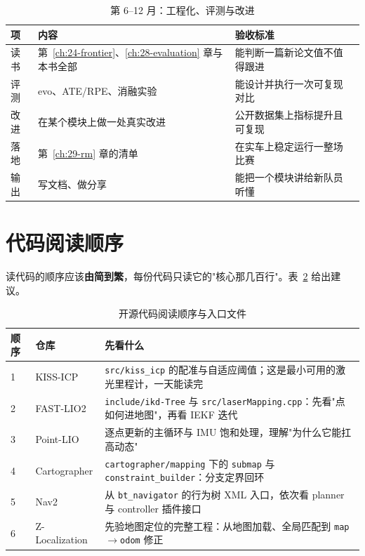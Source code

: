 \begin{table}[htbp]
  \centering
  \caption{第 6--12 月：工程化、评测与改进}\label{tab:30-s4}
  \small
  \begin{tabular}{lp{3.4cm}p{3.6cm}p{3.6cm}}
    \toprule
    项 & 内容 & 验收标准 \\
    \midrule
    读书 & 第~\ref{ch:24-frontier}、\ref{ch:28-evaluation} 章与本书全部 & 能判断一篇新论文值不值得跟进 \\
    评测 & evo、ATE/RPE、消融实验 & 能设计并执行一次可复现对比 \\
    改进 & 在某个模块上做一处真实改进 & 公开数据集上指标提升且可复现 \\
    落地 & 第~\ref{ch:29-rm} 章的清单 & 在实车上稳定运行一整场比赛 \\
    输出 & 写文档、做分享 & 能把一个模块讲给新队员听懂 \\
    \bottomrule
  \end{tabular}
\end{table}

\section{代码阅读顺序}\label{sec:30-code}

读代码的顺序应该\textbf{由简到繁}，每份代码只读它的"核心那几百行"。表~\ref{tab:30-code} 给出建议。

\begin{table}[htbp]
  \centering
  \caption{开源代码阅读顺序与入口文件}\label{tab:30-code}
  \footnotesize
  \begin{tabular}{p{2.5cm}p{4.4cm}p{6.6cm}}
    \toprule
    顺序 & 仓库 & 先看什么 \\
    \midrule
    1 & KISS-ICP \cite{vizzo2023kissicp} & \lstinline{src/kiss_icp} 的配准与自适应阈值；这是最小可用的激光里程计，一天能读完 \\
    2 & FAST-LIO2 \cite{xu2022fastlio2} & \lstinline{include/ikd-Tree} 与 \lstinline{src/laserMapping.cpp}：先看"点如何进地图"，再看 IEKF 迭代 \\
    3 & Point-LIO \cite{he2023pointlio} & 逐点更新的主循环与 IMU 饱和处理，理解"为什么它能扛高动态" \\
    4 & Cartographer \cite{hess2016cartographer} & \lstinline{cartographer/mapping} 下的 \lstinline{submap} 与 \lstinline{constraint_builder}：分支定界回环 \\
    5 & Nav2 \cite{macenski2020nav2} & 从 \lstinline{bt_navigator} 的行为树 XML 入口，依次看 planner 与 controller 插件接口 \\
    6 & Z-Localization \cite{zloc2026} & 先验地图定位的完整工程：从地图加载、全局匹配到 \lstinline{map}$\to$\lstinline{odom} 修正 \\
    \bottomrule
  \end{tabular}
\end{table}

